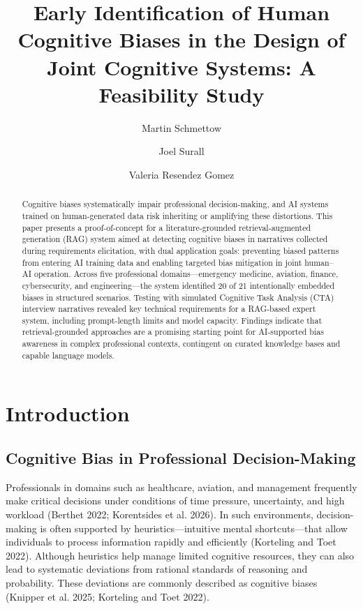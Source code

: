 \documentclass[
  letterpaper,
  DIV=11,
  numbers=noendperiod]{scrartcl}
\title{Early Identification of Human Cognitive Biases in the Design of
Joint Cognitive Systems: A Feasibility Study}
\author{Martin Schmettow \and Joel Surall \and Valeria Resendez Gomez}
\date{}
\begin{document}
\maketitle
\begin{abstract}
Cognitive biases systematically impair professional decision-making, and
AI systems trained on human-generated data risk inheriting or amplifying
these distortions. This paper presents a proof-of-concept for a
literature-grounded retrieval-augmented generation (RAG) system aimed at
detecting cognitive biases in narratives collected during requirements
elicitation, with dual application goals: preventing biased patterns
from entering AI training data and enabling targeted bias mitigation in
joint human--AI operation. Across five professional domains---emergency
medicine, aviation, finance, cybersecurity, and engineering---the system
identified 20 of 21 intentionally embedded biases in structured
scenarios. Testing with simulated Cognitive Task Analysis (CTA)
interview narratives revealed key technical requirements for a RAG-based
expert system, including prompt-length limits and model capacity.
Findings indicate that retrieval-grounded approaches are a promising
starting point for AI-supported bias awareness in complex professional
contexts, contingent on curated knowledge bases and capable language
models.
\end{abstract}


\section{Introduction}\label{introduction}

\subsection{Cognitive Bias in Professional
Decision-Making}\label{cognitive-bias-in-professional-decision-making}

Professionals in domains such as healthcare, aviation, and management
frequently make critical decisions under conditions of time pressure,
uncertainty, and high workload (Berthet 2022; Korentsides et al. 2026).
In such environments, decision-making is often supported by
heuristics---intuitive mental shortcuts---that allow individuals to
process information rapidly and efficiently (Korteling and Toet 2022).
Although heuristics help manage limited cognitive resources, they can
also lead to systematic deviations from rational standards of reasoning
and probability. These deviations are commonly described as cognitive
biases (Knipper et al. 2025; Korteling and Toet 2022).
\end{document}
